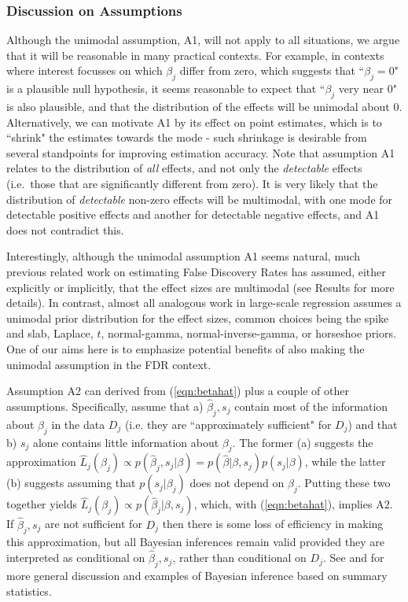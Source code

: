 \documentclass[10pt]{article}
\begin{document}
 \subsubsection*{Discussion on Assumptions}
 
Although the unimodal assumption, A1, will not apply to all situations, we argue that it will be reasonable in many practical contexts. 
For example, in contexts where interest focusses on which $\beta_j$ differ from zero, which suggests that ``$\beta_j=0$" is a plausible null hypothesis,  
it seems reasonable to expect that ``$\beta_j$ very near 0" is also plausible, and that the distribution of the effects will be unimodal about 0. 
Alternatively, we can motivate A1 by its effect on point estimates, which is to ``shrink" the estimates towards the mode - 
such shrinkage is desirable from several standpoints for improving estimation accuracy. 
Note that assumption A1 relates to the distribution of {\it all} effects, and not only the {\it detectable} effects (i.e.~those that are significantly different from zero). It is very likely that the distribution of {\it detectable} non-zero effects will be multimodal, with one mode for detectable positive effects and another for detectable negative effects, and A1 does not contradict this.

Interestingly, although the unimodal assumption A1 seems natural, much previous related work on estimating False Discovery Rates  
has assumed, either explicitly or implicitly, that the effect sizes are multimodal (see Results for more details). 
In contrast, almost all analogous work in large-scale regression assumes
a unimodal prior distribution for the effect sizes, common choices being the spike and slab, Laplace, $t$, normal-gamma, normal-inverse-gamma, or horseshoe priors.
One of our aims here is to emphasize potential benefits of also making the unimodal assumption in the FDR context.

Assumption A2 can derived from (\ref{eqn:betahat}) plus a couple of other assumptions. Specifically, assume that a) $\hat\beta_j, s_j$ contain most of the information about $\beta_j$ in the data $D_j$ (i.e. they are ``approximately sufficient" for $D_j$) and that b) $s_j$ alone contains little information about $\beta_j$. The former (a) suggests the approximation $\hat{L}_j(\beta_j) \propto p(\hat\beta_j, s_j | \beta) = p(\hat\beta | \beta, s_j) p(s_j | \beta)$, while the latter (b) suggests assuming that $p(s_j|\beta_j)$ does not depend on $\beta_j$. Putting these two together yields $\hat{L}_j(\beta_j) \propto p(\hat\beta_j | \beta, s_j)$, which, with (\ref{eqn:betahat}),  implies A2. If $\hat\beta_j, s_j$ are not sufficient for $D_j$ then there is some loss of efficiency in making this approximation, but all Bayesian inferences remain valid provided they are interpreted as conditional on $\hat\beta_j,s_j$, rather than conditional on $D_j$. See \cite{johnson.xx} and \cite{wakefield.xx} for more general discussion and examples of Bayesian inference based on summary statistics. 
\end{document}
